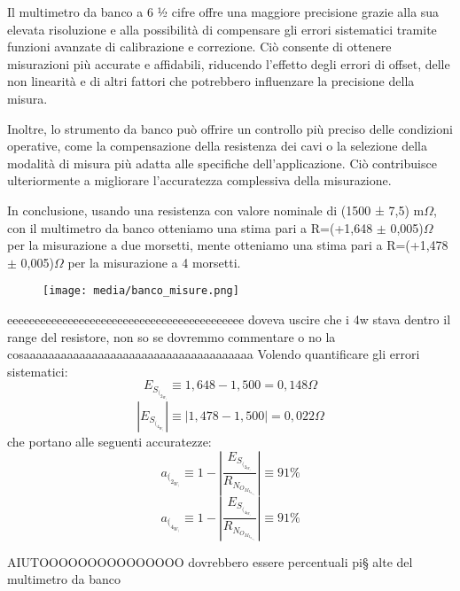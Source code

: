 Il multimetro da banco a 6 ½ cifre offre una maggiore precisione grazie alla sua elevata risoluzione e alla possibilità di compensare gli errori sistematici tramite funzioni avanzate di calibrazione e correzione. Ciò consente di ottenere misurazioni più accurate e affidabili, riducendo l'effetto degli errori di offset, delle non linearità e di altri fattori che potrebbero influenzare la precisione della misura.

Inoltre, lo strumento da banco può offrire un controllo più preciso delle condizioni operative, come la compensazione della resistenza dei cavi o la selezione della modalità di misura più adatta alle specifiche dell'applicazione. Ciò contribuisce ulteriormente a migliorare l'accuratezza complessiva della misurazione.

In conclusione, usando una resistenza con valore nominale di (1500 ± 7,5) m$\Omega$, con il multimetro da banco otteniamo una stima pari a R=(+1,648 $\pm$ 0,005)$\Omega$ per la misurazione a due morsetti, mente otteniamo una stima pari a R=(+1,478 $\pm$ 0,005)$\Omega$ per la misurazione a 4 morsetti.

\begin{figure}[h]
    \centering
    \texttt{[image: media/banco\_misure.png]}
    \label{fig:range}
\end{figure}

eeeeeeeeeeeeeeeeeeeeeeeeeeeeeeeeeeeeeeeeeee doveva uscire che i 4w stava dentro il range del resistore, non so se dovremmo commentare o no la cosaaaaaaaaaaaaaaaaaaaaaaaaaaaaaaaaaaaaa
\newline
Volendo quantificare gli errori sistematici:
\begin{equation}
    E_S_(_2_W_) \equiv 1,648 - 1,500 = 0,148 \Omega
\end{equation}
\begin{equation}
    | E_S_(_4_W_) | \equiv | 1,478 - 1,500  |= 0,022 \Omega
\end{equation}
che portano alle seguenti accuratezze: 
\begin{equation}
    a_(_2_W_) \equiv 1 - | \frac{E_S_(_2_W_)}{R_N_O_M_I_N_A_L_E} | \equiv 91\%
\end{equation}
\begin{equation}
    a_(_4_W_) \equiv 1 - | \frac{E_S_(_4_W_)}{R_N_O_M_I_N_A_L_E} | \equiv 91\%
\end{equation}

AIUTOOOOOOOOOOOOOOO dovrebbero essere percentuali pi§ alte del multimetro da banco














